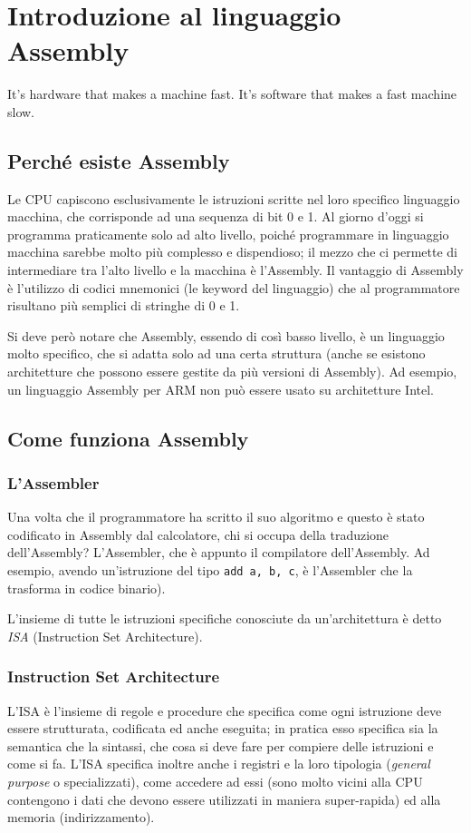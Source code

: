 \documentclass[class=book, crop=false, oneside]{standalone}
\begin{document}
\chapter{Introduzione al linguaggio Assembly}\begin{fquote}It's hardware that makes a machine fast. It's software that makes a fast machine slow.
 \end{fquote}

\section{Perché esiste Assembly}

Le CPU capiscono esclusivamente le istruzioni scritte nel loro specifico linguaggio macchina, che corrisponde ad una sequenza di bit 0 e 1.
Al giorno d'oggi si programma praticamente solo ad alto livello, poiché programmare in linguaggio macchina sarebbe molto più complesso e dispendioso; il mezzo che ci permette di intermediare tra l'alto livello e la macchina è l’Assembly. Il vantaggio di Assembly è l'utilizzo di codici mnemonici (le keyword del linguaggio) che al programmatore risultano più semplici di stringhe di 0 e 1.

Si deve però notare che Assembly, essendo di così basso livello, è un linguaggio molto specifico, che si adatta solo ad una certa struttura (anche se esistono architetture che possono essere gestite da più versioni di Assembly). Ad esempio, un linguaggio Assembly per ARM non può essere usato su architetture Intel.

\section{Come funziona Assembly}

\subsection{L'Assembler}
Una volta che il programmatore ha scritto il suo algoritmo e questo è stato codificato in Assembly dal calcolatore, chi si occupa della traduzione dell'Assembly? L'Assembler, che è appunto il compilatore dell'Assembly. Ad esempio, avendo un'istruzione del tipo \texttt{add a, b, c}, è l'Assembler che la trasforma in codice binario).

L'insieme di tutte le istruzioni specifiche conosciute da un’architettura è detto \emph{ISA} (Instruction Set Architecture).

\subsection{Instruction Set Architecture}
L’ISA è l'insieme di regole e procedure che specifica come ogni istruzione deve essere strutturata, codificata ed anche eseguita; in pratica esso specifica sia la semantica che la sintassi, che cosa si deve fare per compiere delle istruzioni e come si fa. L'ISA specifica inoltre anche i registri e la loro tipologia (\emph{general purpose} o specializzati), come accedere ad essi (sono molto vicini alla CPU contengono i dati che devono essere utilizzati in maniera super-rapida) ed alla memoria (indirizzamento).
\end{document}
